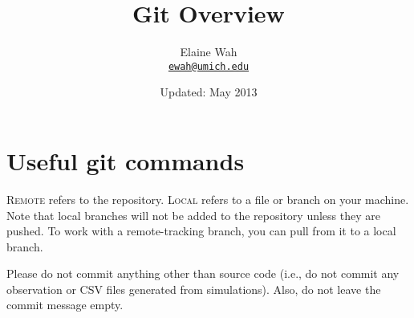 \documentclass[11pt]{article}
\newcommand{\email}[1]{\href{mailto:#1}{\texttt{#1}}}
\begin{document}
	
\title{Git Overview}
\author{
  Elaine Wah \\
  \email{ewah@umich.edu}
}
\date{Updated: May 2013}
\maketitle

\section{Useful git commands}

\textsc{Remote} refers to the repository. \textsc{Local} refers to a file or branch on your machine. Note that local branches will not be added to the repository unless they are pushed. To work with a remote-tracking branch, you can pull from it to a local branch.

Please do not commit anything other than source code (i.e., do not commit any observation or CSV files generated from simulations). Also, do not leave the commit message empty.\\
\end{document}
